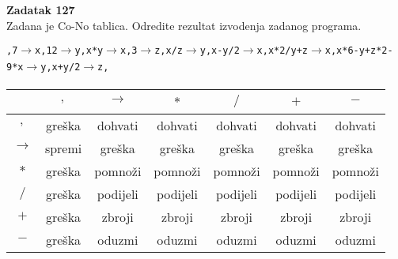 \documentclass[12pt]{article}
\newenvironment{problem}[2][Zadatak]
    { \begin{mdframed}[backgroundcolor=lightgray] \textbf{#1 #2} \\}
    {  \end{mdframed}}
\begin{document}
\begin{problem}{127}
    Zadana je Co-No tablica. Odredite rezultat izvodenja zadanog programa.
    
    \noindent\texttt{,7$\xrightarrow[]{}$x,12$\xrightarrow[]{}$y,x*y$\xrightarrow[]{}$x,3$\xrightarrow[]{}$z,x/z$\xrightarrow[]{}$y,x-y/2$\xrightarrow[]{}$x,x*2/y+z$\xrightarrow[]{}$x,x*6-y+z*2-9*x$\xrightarrow[]{}$y,x+y/2$\xrightarrow[]{}$z,} \\
    
        \begin{tabular}{|c|c|c|c|c|c|c|}
            \hline
             & $,$ & $\xrightarrow[]{}$ & $*$ & $/$ & $+$ & $-$\\
            \hline
            $,$ & greška & dohvati & dohvati & dohvati & dohvati & dohvati \\
            \hline
             $\xrightarrow[]{}$ & spremi & greška & greška & greška & greška & greška\\
            \hline
             $*$& greška & pomnoži & pomnoži & pomnoži & pomnoži & pomnoži\\
            \hline
             $/$& greška & podijeli & podijeli & podijeli & podijeli & podijeli\\
            \hline
             $+$& greška & zbroji & zbroji & zbroji & zbroji & zbroji\\
            \hline
            $-$ & greška & oduzmi & oduzmi & oduzmi & oduzmi & oduzmi\\
            \hline
        \end{tabular}
\end{problem}
\end{document}

